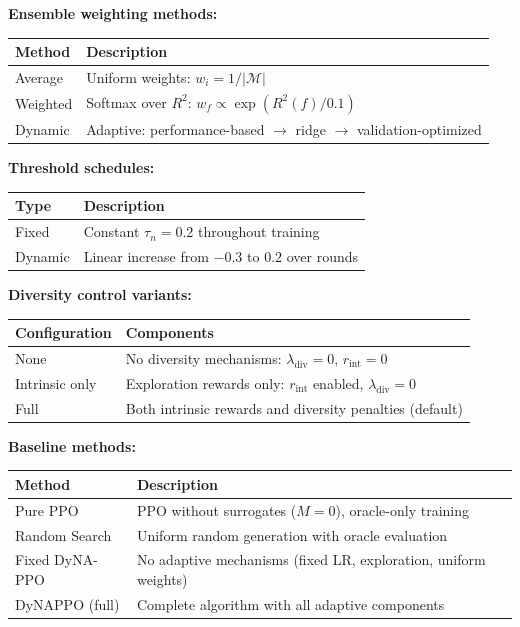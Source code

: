 \documentclass[conference]{IEEEtran}
\begin{document}
\textbf{Ensemble weighting methods:}
\begin{table}[h]
\centering
\small
\setlength{\tabcolsep}{3pt}
\begin{tabularx}{\columnwidth}{@{} l >{\RaggedRight}X @{}}
\toprule
\textbf{Method} & \textbf{Description} \\
\midrule
Average & Uniform weights: $w_i = 1/|\mathcal{M}|$ \\
Weighted & Softmax over $R^2$: $w_f \propto \exp(R^2(f)/0.1)$ \\
Dynamic & Adaptive: performance-based $\to$ ridge $\to$ validation-optimized \\
\bottomrule
\end{tabularx}
\end{table}

\textbf{Threshold schedules:}
\begin{table}[h]
\centering
\small
\setlength{\tabcolsep}{3pt}
\begin{tabularx}{\columnwidth}{@{} l >{\RaggedRight}X @{}}
\toprule
\textbf{Type} & \textbf{Description} \\
\midrule
Fixed & Constant $\tau_n = 0.2$ throughout training \\
Dynamic & Linear increase from $-0.3$ to $0.2$ over rounds \\
\bottomrule
\end{tabularx}
\end{table}

\textbf{Diversity control variants:}
\begin{table}[h]
\centering
\small
\setlength{\tabcolsep}{3pt}
\begin{tabularx}{\columnwidth}{@{} l >{\RaggedRight}X @{}}
\toprule
\textbf{Configuration} & \textbf{Components} \\
\midrule
None & No diversity mechanisms: $\lambda_{\text{div}} = 0$, $r_{\text{int}} = 0$ \\
Intrinsic only & Exploration rewards only: $r_{\text{int}}$ enabled, $\lambda_{\text{div}} = 0$ \\
Full & Both intrinsic rewards and diversity penalties (default) \\
\bottomrule
\end{tabularx}
\end{table}

\textbf{Baseline methods:}
\begin{table}[h]
\centering
\small
\setlength{\tabcolsep}{3pt}
\begin{tabularx}{\columnwidth}{@{} l >{\RaggedRight}X @{}}
\toprule
\textbf{Method} & \textbf{Description} \\
\midrule
Pure PPO & PPO without surrogates ($M=0$), oracle-only training \\
Random Search & Uniform random generation with oracle evaluation \\
Fixed DyNA-PPO & No adaptive mechanisms (fixed LR, exploration, uniform weights) \\
DyNAPPO (full) & Complete algorithm with all adaptive components \\
\bottomrule
\end{tabularx}
\end{table}
\end{document}
